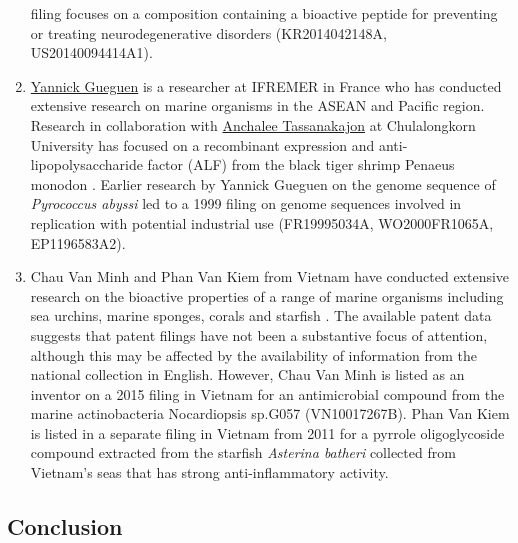 \documentclass[]{book}
\theoremstyle{definition}
\theoremstyle{definition}
\theoremstyle{definition}
\theoremstyle{remark}
\begin{document}
\begin{enumerate}
  filing focuses on a composition containing a bioactive peptide for
  preventing or treating neurodegenerative disorders (KR2014042148A,
  US20140094414A1).
\item
  \href{http://orcid.org/0000-0002-8749-9582}{Yannick Gueguen} is a
  researcher at IFREMER in France who has conducted extensive research
  on marine organisms in the ASEAN and Pacific region. Research in
  collaboration with
  \href{http://www.bc.sc.chula.ac.th/11Anchalee.html}{Anchalee
  Tassanakajon} at Chulalongkorn University has focused on a recombinant
  expression and anti-lipopolysaccharide factor (ALF) from the black
  tiger shrimp Penaeus monodon \citep{Somboonwiwat_2005}. Earlier
  research by Yannick Gueguen on the genome sequence of \emph{Pyrococcus
  abyssi} led to a 1999 filing on genome sequences involved in
  replication with potential industrial use (FR19995034A, WO2000FR1065A,
  EP1196583A2).
\item
  Chau Van Minh and Phan Van Kiem from Vietnam have conducted extensive
  research on the bioactive properties of a range of marine organisms
  including sea urchins, marine sponges, corals and starfish
  \citep{Thao_2015, Thao_2015a, Kiem_2017, Ngoc_2017, Vien_2016}. The
  available patent data suggests that patent filings have not been a
  substantive focus of attention, although this may be affected by the
  availability of information from the national collection in English.
  However, Chau Van Minh is listed as an inventor on a 2015 filing in
  Vietnam for an antimicrobial compound from the marine actinobacteria
  Nocardiopsis sp.G057 (VN10017267B). Phan Van Kiem is listed in a
  separate filing in Vietnam from 2011 for a pyrrole oligoglycoside
  compound extracted from the starfish \emph{Asterina batheri} collected
  from Vietnam's seas that has strong anti-inflammatory activity.
\end{enumerate}

\hypertarget{conclusion-2}{%
\subsection{Conclusion}\label{conclusion-2}}
\end{document}
